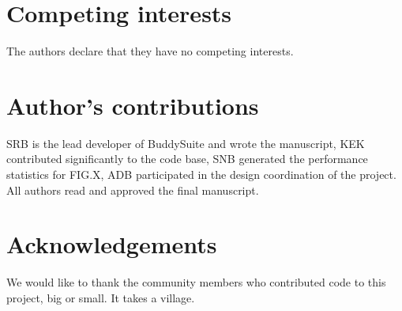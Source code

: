 \documentclass[twocolumn]{bmcart}%
\begin{document}
\begin{backmatter}

\section*{Competing interests}
  The authors declare that they have no competing interests.

\section*{Author's contributions}
  SRB is the lead developer of BuddySuite and wrote the manuscript, KEK contributed significantly to the code base, SNB generated the performance statistics for FIG.X, ADB participated in the design coordination of the project. All authors read and approved the final manuscript.

\section*{Acknowledgements}
  We would like to thank the community members who contributed code to this project, big or small. It takes a village.





\end{backmatter}
\end{document}
